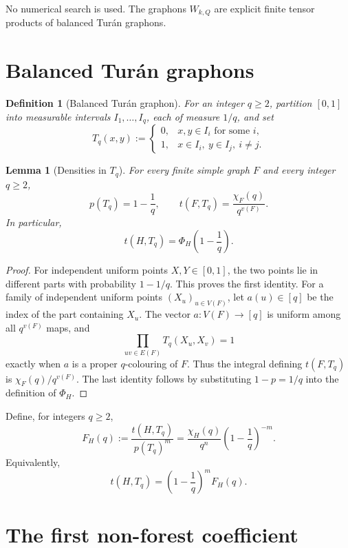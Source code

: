 \documentclass[11pt]{article}
\newtheorem{lemma}{Lemma}
\newtheorem{definition}{Definition}
\newcommand{\PhiH}{\Phi_H}
\begin{document}
No numerical search is used.  The graphons \(W_{k,Q}\) are explicit
finite tensor products of balanced Tur\'{a}n graphons.

\section{Balanced Tur\'{a}n graphons}

\begin{definition}[Balanced Tur\'{a}n graphon]
For an integer \(q\ge2\), partition \([0,1]\) into measurable intervals
\(I_1,\dots,I_q\), each of measure \(1/q\), and set
\[
    T_q(x,y)
    :=
    \begin{cases}
        0,&x,y\in I_i\text{ for some }i,\\
        1,&x\in I_i,\ y\in I_j,\ i\ne j.
    \end{cases}
\]
\end{definition}

\begin{lemma}[Densities in \(T_q\)]\label{lem:turan-density}
For every finite simple graph \(F\) and every integer \(q\ge2\),
\[
    p(T_q)=1-\frac1q,
    \qquad
    t(F,T_q)=\frac{\chi_F(q)}{q^{v(F)}}.
\]
In particular,
\[
    t(H,T_q)=\PhiH\!\left(1-\frac1q\right).
\]
\end{lemma}

\begin{proof}
For independent uniform points \(X,Y\in[0,1]\), the two points lie in
different parts with probability \(1-1/q\).  This proves the first
identity.  For a family of independent uniform points
\((X_u)_{u\in V(F)}\), let \(a(u)\in[q]\) be the index of the part
containing \(X_u\).  The vector \(a\colon V(F)\to[q]\) is uniform among
all \(q^{v(F)}\) maps, and
\[
    \prod_{uv\in E(F)}T_q(X_u,X_v)=1
\]
exactly when \(a\) is a proper \(q\)-colouring of \(F\).  Thus the
integral defining \(t(F,T_q)\) is
\(\chi_F(q)/q^{v(F)}\).  The last identity follows by substituting
\(1-p=1/q\) into the definition of \(\Phi_H\).
\end{proof}

Define, for integers \(q\ge2\),
\[
    F_H(q)
    :=
    \frac{t(H,T_q)}{p(T_q)^m}
    =
    \frac{\chi_H(q)}{q^n}
    \left(1-\frac1q\right)^{-m}.
\]
Equivalently,
\[
    t(H,T_q)
    =
    \left(1-\frac1q\right)^m F_H(q).
\]

\section{The first non-forest coefficient}
\end{document}
